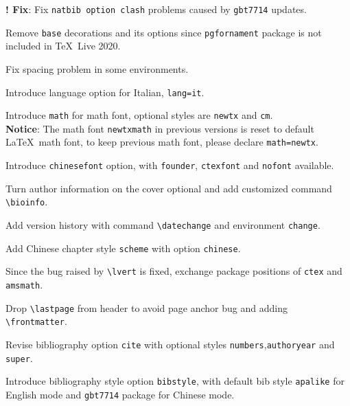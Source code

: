 \documentclass[11pt]{elegantbook}
\begin{document}
\begin{change}
  \item \textbf{! Fix}: Fix \lstinline{natbib option clash} problems caused by \lstinline{gbt7714} updates.
  \item Remove \lstinline{base} decorations and its options since \lstinline{pgfornament} package is not included in \TeX~Live 2020.
  \item Fix spacing problem in some environments.
  \item Introduce language option for Italian, \lstinline{lang=it}.
\end{change}



\begin{change}
  \item Introduce \lstinline{math} for math font, optional styles are \lstinline{newtx} and \lstinline{cm}.\\
  \textbf{Notice}: The math font \lstinline{newtxmath} in previous versions is reset to default \LaTeX\ math font, to keep previous math font, please declare \lstinline{math=newtx}.
  \item Introduce \lstinline{chinesefont} option, with \lstinline{founder}, \lstinline{ctexfont} and \lstinline{nofont} available.
  \item Turn author information on the cover optional and add customized command \lstinline{\bioinfo}.
  \item Add version history with command \lstinline{\datechange} and environment \lstinline{change}.
  \item Add Chinese chapter style \lstinline{scheme} with option \lstinline{chinese}.
  \item Since the bug raised by \lstinline{\lvert} is fixed, exchange package positions of \lstinline{ctex} and \lstinline{amsmath}.
  \item Drop \lstinline{\lastpage} from header to avoid page anchor bug and adding \lstinline{\frontmatter}.
  \item Revise bibliography option \lstinline{cite} with optional styles \lstinline{numbers},\lstinline{authoryear} and \lstinline{super}.
  \item Introduce bibliography style option \lstinline{bibstyle}, with default bib style \lstinline{apalike} for English mode and \lstinline{gbt7714} package for Chinese mode.
\end{change}

\end{document}
